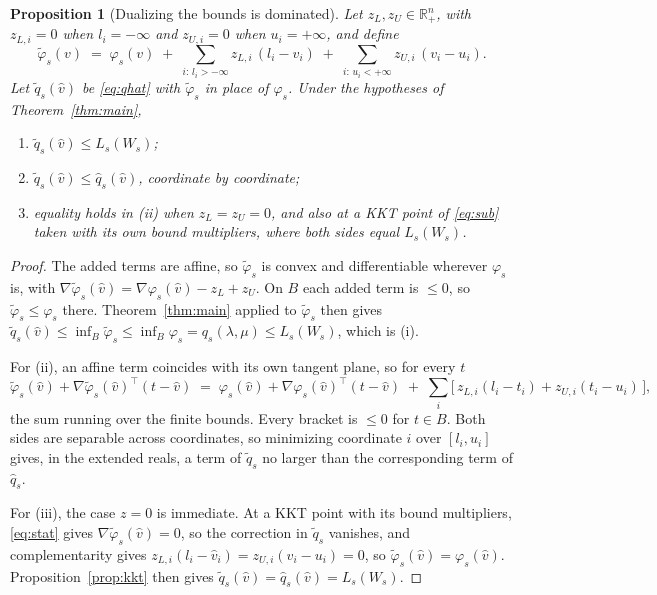 \documentclass[11pt]{article}
\theoremstyle{plain}
\newtheorem{proposition}[lemma]{Proposition}
\theoremstyle{remark}
\newcommand{\R}{\mathbb{R}}
\newcommand{\W}{W}
\newcommand{\vhat}{\hat{v}}
\newcommand{\qhat}{\hat{q}}
\begin{document}
\begin{proposition}[Dualizing the bounds is dominated]\label{prop:dualbox}
Let $z_L, z_U \in \R^{n}_{+}$, with $z_{L,i} = 0$ when $l_i = -\infty$ and
$z_{U,i} = 0$ when $u_i = +\infty$, and define
\[
  \tilde\varphi_s(v) \;=\; \varphi_s(v)
     \;+\; \sum_{i :\, l_i > -\infty} z_{L,i}\,(l_i - v_i)
     \;+\; \sum_{i :\, u_i < +\infty} z_{U,i}\,(v_i - u_i).
\]
Let $\tilde q_s(\vhat)$ be \eqref{eq:qhat} with $\tilde\varphi_s$ in place of
$\varphi_s$.  Under the hypotheses of Theorem~\ref{thm:main},
\begin{enumerate}
  \item[(i)] $\tilde q_s(\vhat) \le L_s(\W_s)$;
  \item[(ii)] $\tilde q_s(\vhat) \le \qhat_s(\vhat)$, coordinate by coordinate;
  \item[(iii)] equality holds in (ii) when $z_L = z_U = 0$, and also at a KKT point
        of \eqref{eq:sub} taken with its own bound multipliers, where both
        sides equal $L_s(\W_s)$.
\end{enumerate}
\end{proposition}

\begin{proof}
The added terms are affine, so $\tilde\varphi_s$ is convex and differentiable
wherever $\varphi_s$ is, with
$\nabla \tilde\varphi_s(\vhat) = \nabla \varphi_s(\vhat) - z_L + z_U$.  On $B$
each added term is $\le 0$, so $\tilde\varphi_s \le \varphi_s$ there.
Theorem~\ref{thm:main} applied to $\tilde\varphi_s$ then gives
$\tilde q_s(\vhat) \le \inf_{B} \tilde\varphi_s \le \inf_{B} \varphi_s
= q_s(\lambda,\mu) \le L_s(\W_s)$, which is (i).

For (ii), an affine term coincides with its own tangent plane, so for every $t$
\[
  \tilde\varphi_s(\vhat) + \nabla \tilde\varphi_s(\vhat)^{\top}(t - \vhat)
  \;=\;
  \varphi_s(\vhat) + \nabla \varphi_s(\vhat)^{\top}(t - \vhat)
  \;+\; \sum_{i} \bigl[\, z_{L,i}(l_i - t_i) + z_{U,i}(t_i - u_i) \,\bigr],
\]
the sum running over the finite bounds.  Every bracket is $\le 0$ for
$t \in B$.  Both sides are separable across coordinates, so minimizing
coordinate $i$ over $[l_i, u_i]$ gives, in the extended reals, a term of
$\tilde q_s$ no larger than the corresponding term of $\qhat_s$.

For (iii), the case $z = 0$ is immediate.  At a KKT point with its bound
multipliers, \eqref{eq:stat} gives $\nabla \tilde\varphi_s(\vhat) = 0$, so the
correction in $\tilde q_s$ vanishes, and complementarity gives
$z_{L,i}(l_i - \vhat_i) = z_{U,i}(\vhat_i - u_i) = 0$, so
$\tilde\varphi_s(\vhat) = \varphi_s(\vhat)$.  Proposition~\ref{prop:kkt} then
gives $\tilde q_s(\vhat) = \qhat_s(\vhat) = L_s(\W_s)$.
\end{proof}
\end{document}
